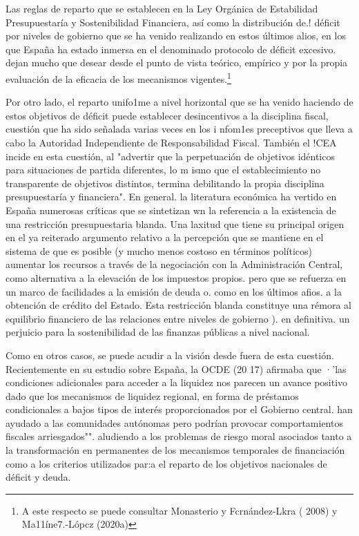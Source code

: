 \documentclass[10pt,a4paper]{article}
\begin{document}
{Las reglas de reparto que se establecen en la Ley Orgánica de Estabilidad Presupuestaría y Sostenibilidad Financiera, así como la distribución de.! déficit por niveles de gobierno que se ha venido realizando en estos últimos alios, en los que España ha estado inmersa en el denominado protocolo de déficit excesivo. dejan mucho que desear desde el punto de vista teórico, empírico y por la propia evaluación de la eficacia de los mecanismos vigentes.\footnote{%
    A este respecto se puede consultar Monasterio y Fcrnández-Lkra ( 2008) y Ma11íne7.-Lópcz (2020a)
}

Por otro lado, el reparto unifo1me a nivel horizontal que se ha venido haciendo de estos objetivos de déficit puede establecer desincentivos a la disciplina fiscal, cuestión que ha sido señalada varias  veces en los i nfom1es preceptivos que lleva a cabo la Autoridad Independiente de Responsabilidad Fiscal. También el !CEA incide en esta cuestión, al "advertir que la perpetuación de objetivos idénticos para situaciones de partida diferentes, lo m ismo que el establecimiento no transparente de objetivos distintos, termina debilitando la propia disciplina presupuestaría y financiera". En general. la literatura económica ha vertido en España numerosas críticas que se sintetizan wn la referencia a la existencia de una restricción presupuestaria blanda. Una laxitud que tiene su principal origen en el ya reiterado argumento relativo a la percepción que se mantiene en el sistema de que es posible (y mucho menos costoso en términos políticos) aumentar los recursos a través de la negociación con la Administración Central, como alternativa a la elevación de los impuestos propios. pero que se refuerza en un marco de facilidades a la emisión de deuda o. como en los últimos afios. a la obtención de crédito del Estado. Esta restricción blanda constituye una rémora al equilibrio financiero de las relaciones entre niveles de gobierno ). en definitiva. un perjuicio para la sostenibilidad de las finanzas públicas a nivel nacional.

Como en otros casos, se puede acudir a la visión desde fuera de esta cuestión. Recientemente en su estudio sobre España, la OCDE (20 17) afirmaba que ·'las condiciones adicionales para acceder a la liquidez nos parecen un avance positivo dado que los mecanismos de liquidez regional, en forma de préstamos condicionales a bajos tipos de interés proporcionados por el Gobierno central. han ayudado a las comunidades autónomas pero podrían provocar comportamientos fiscales arriesgados"". aludiendo a los problemas de riesgo moral asociados tanto a la transformación en permanentes de los mecanismos temporales de financiación como a los criterios utilizados par:a el reparto de los objetivos nacionales de déficit y deuda.

}
\end{document}
